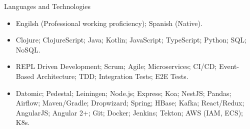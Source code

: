 \documentclass[calibri]{../macdowell-cv/mcdowellcv}
\begin{document}
	\begin{cvsection}{Languages and Technologies}
		\begin{cvsubsection}{}{}{}	
			\begin{itemize}
				\item Engilsh (Professional working proficiency); Spanish (Native).
				\item Clojure; ClojureScript; Java; Kotlin; JavaScript; TypeScript; Python; SQL; NoSQL.
				\item REPL Driven Development; Scrum; Agile; Microservices; CI/CD; Event-Based Architecture; TDD; Integration Tests; E2E Tests.
				\item Datomic; Pedestal; Leiningen; Node.js; Express; Koa; NestJS; Pandas; Airflow; Maven/Gradle; Dropwizard; Spring; HBase; Kafka; React/Redux; AngularJS; Angular 2+; Git; Docker; Jenkins; Tekton; AWS (IAM, ECS); K8s.
			\end{itemize}
		\end{cvsubsection}
	\end{cvsection}
\end{document}
